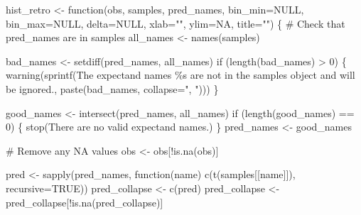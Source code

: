 \documentclass[
  letterpaper,
  DIV=11,
  numbers=noendperiod]{scrartcl}
\newenvironment{Shaded}{\begin{snugshade}}{\end{snugshade}}
\newcommand{\AttributeTok}[1]{\textcolor[rgb]{0.40,0.45,0.13}{#1}}
\newcommand{\CommentTok}[1]{\textcolor[rgb]{0.37,0.37,0.37}{#1}}
\newcommand{\ConstantTok}[1]{\textcolor[rgb]{0.56,0.35,0.01}{#1}}
\newcommand{\ControlFlowTok}[1]{\textcolor[rgb]{0.00,0.23,0.31}{#1}}
\newcommand{\DecValTok}[1]{\textcolor[rgb]{0.68,0.00,0.00}{#1}}
\newcommand{\FunctionTok}[1]{\textcolor[rgb]{0.28,0.35,0.67}{#1}}
\newcommand{\NormalTok}[1]{\textcolor[rgb]{0.00,0.23,0.31}{#1}}
\newcommand{\OtherTok}[1]{\textcolor[rgb]{0.00,0.23,0.31}{#1}}
\newcommand{\SpecialCharTok}[1]{\textcolor[rgb]{0.37,0.37,0.37}{#1}}
\newcommand{\StringTok}[1]{\textcolor[rgb]{0.13,0.47,0.30}{#1}}
\begin{document}
\begin{Shaded}
\begin{Highlighting}[]
\NormalTok{hist\_retro }\OtherTok{\textless{}{-}} \ControlFlowTok{function}\NormalTok{(obs, samples, pred\_names,}
                       \AttributeTok{bin\_min=}\ConstantTok{NULL}\NormalTok{, }\AttributeTok{bin\_max=}\ConstantTok{NULL}\NormalTok{, }\AttributeTok{delta=}\ConstantTok{NULL}\NormalTok{,}
                       \AttributeTok{xlab=}\StringTok{""}\NormalTok{, }\AttributeTok{ylim=}\ConstantTok{NA}\NormalTok{, }\AttributeTok{title=}\StringTok{""}\NormalTok{) \{}
  \CommentTok{\# Check that pred\_names are in samples}
\NormalTok{  all\_names }\OtherTok{\textless{}{-}} \FunctionTok{names}\NormalTok{(samples)}

\NormalTok{  bad\_names }\OtherTok{\textless{}{-}} \FunctionTok{setdiff}\NormalTok{(pred\_names, all\_names)}
  \ControlFlowTok{if}\NormalTok{ (}\FunctionTok{length}\NormalTok{(bad\_names) }\SpecialCharTok{\textgreater{}} \DecValTok{0}\NormalTok{) \{}
    \FunctionTok{warning}\NormalTok{(}\FunctionTok{sprintf}\NormalTok{(}\StringTok{\textquotesingle{}The expectand names \%s are not in the \textasciigrave{}samples\textasciigrave{} object and will be ignored.\textquotesingle{}}\NormalTok{,}
                    \FunctionTok{paste}\NormalTok{(bad\_names, }\AttributeTok{collapse=}\StringTok{", "}\NormalTok{)))}
\NormalTok{  \}}

\NormalTok{  good\_names }\OtherTok{\textless{}{-}} \FunctionTok{intersect}\NormalTok{(pred\_names, all\_names)}
  \ControlFlowTok{if}\NormalTok{ (}\FunctionTok{length}\NormalTok{(good\_names) }\SpecialCharTok{==} \DecValTok{0}\NormalTok{) \{}
    \FunctionTok{stop}\NormalTok{(}\StringTok{\textquotesingle{}There are no valid expectand names.\textquotesingle{}}\NormalTok{)}
\NormalTok{  \}}
\NormalTok{  pred\_names }\OtherTok{\textless{}{-}}\NormalTok{ good\_names}

  \CommentTok{\# Remove any NA values}
\NormalTok{  obs }\OtherTok{\textless{}{-}}\NormalTok{ obs[}\SpecialCharTok{!}\FunctionTok{is.na}\NormalTok{(obs)]}

\NormalTok{  pred }\OtherTok{\textless{}{-}} \FunctionTok{sapply}\NormalTok{(pred\_names,}
                 \ControlFlowTok{function}\NormalTok{(name) }\FunctionTok{c}\NormalTok{(}\FunctionTok{t}\NormalTok{(samples[[name]]), }\AttributeTok{recursive=}\ConstantTok{TRUE}\NormalTok{))}
\NormalTok{  pred\_collapse }\OtherTok{\textless{}{-}} \FunctionTok{c}\NormalTok{(pred)}
\NormalTok{  pred\_collapse }\OtherTok{\textless{}{-}}\NormalTok{ pred\_collapse[}\SpecialCharTok{!}\FunctionTok{is.na}\NormalTok{(pred\_collapse)]}


\end{Highlighting}
\end{Shaded}
\end{document}
